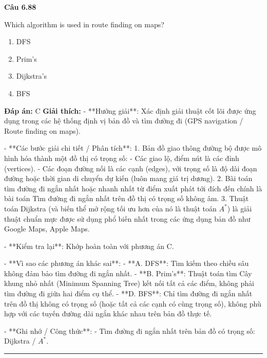 \documentclass[11pt,a4paper]{article}
\newenvironment{question}[1]{%
  \par\vspace{1em}\noindent\textbf{\large Câu #1}\par\vspace{0.4em}
}{%
  \par\vspace{1em}\hrule\vspace{0.6em}
}
\newenvironment{choices}{%
  \begin{enumerate}[label=\textbf{\Alph*.},leftmargin=2.2em,itemsep=2pt,topsep=3pt]
}{%
  \end{enumerate}
}
\newcommand{\choice}{\item}
\begin{document}
\begin{question}{6.88}
Which algorithm is used in route finding on maps?
\begin{choices}
\choice DFS
\choice Prim's
\choice Dijkstra's
\choice BFS
\end{choices}
\textbf{Đáp án:} C
\textbf{Giải thích:} - **Hướng giải**:
  Xác định giải thuật cốt lõi được ứng dụng trong các hệ thống định vị bản đồ và tìm đường đi (GPS navigation / Route finding on maps).

- **Các bước giải chi tiết / Phân tích**:
  1. Bản đồ giao thông đường bộ được mô hình hóa thành một đồ thị có trọng số:
     - Các giao lộ, điểm nút là các đỉnh (vertices).
     - Các đoạn đường nối là các cạnh (edges), với trọng số là độ dài đoạn đường hoặc thời gian di chuyển dự kiến (luôn mang giá trị dương).
  2. Bài toán tìm đường đi ngắn nhất hoặc nhanh nhất từ điểm xuất phát tới đích đến chính là bài toán Tìm đường đi ngắn nhất trên đồ thị có trọng số không âm.
  3. Thuật toán Dijkstra (và biến thể mở rộng tối ưu hơn của nó là thuật toán \(A^*\)) là giải thuật chuẩn mực được sử dụng phổ biến nhất trong các ứng dụng bản đồ như Google Maps, Apple Maps.

- **Kiểm tra lại**:
  Khớp hoàn toàn với phương án C.

- **Vì sao các phương án khác sai**:
  - **A. DFS**: Tìm kiếm theo chiều sâu không đảm bảo tìm đường đi ngắn nhất.
  - **B. Prim's**: Thuật toán tìm Cây khung nhỏ nhất (Minimum Spanning Tree) kết nối tất cả các điểm, không phải tìm đường đi giữa hai điểm cụ thể.
  - **D. BFS**: Chỉ tìm đường đi ngắn nhất trên đồ thị không có trọng số (hoặc tất cả các cạnh có cùng trọng số), không phù hợp với các tuyến đường dài ngắn khác nhau trên bản đồ thực tế.

- **Ghi nhớ / Công thức**:
  - Tìm đường đi ngắn nhất trên bản đồ có trọng số: Dijkstra / \(A^*\).
\end{question}
\end{document}
